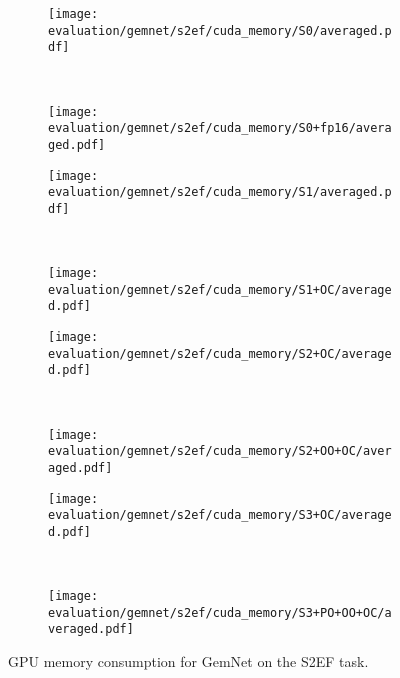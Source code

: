 \begin{figure}[H]

    \centering

    \begin{subfigure}[t]{0.45\textwidth}
        \centering
        \texttt{[image: evaluation/gemnet/s2ef/cuda\_memory/S0/averaged.pdf]}
    \end{subfigure}%
    ~
    \begin{subfigure}[t]{0.45\textwidth}
        \centering
        \texttt{[image: evaluation/gemnet/s2ef/cuda\_memory/S0+fp16/averaged.pdf]}
    \end{subfigure}

    \begin{subfigure}[t]{0.45\textwidth}
        \centering
        \texttt{[image: evaluation/gemnet/s2ef/cuda\_memory/S1/averaged.pdf]}
    \end{subfigure}%
    ~
    \begin{subfigure}[t]{0.45\textwidth}
        \centering
        \texttt{[image: evaluation/gemnet/s2ef/cuda\_memory/S1+OC/averaged.pdf]}
    \end{subfigure}

    \begin{subfigure}[t]{0.45\textwidth}
        \centering
        \texttt{[image: evaluation/gemnet/s2ef/cuda\_memory/S2+OC/averaged.pdf]}
    \end{subfigure}%
    ~
    \begin{subfigure}[t]{0.45\textwidth}
        \centering
        \texttt{[image: evaluation/gemnet/s2ef/cuda\_memory/S2+OO+OC/averaged.pdf]}
    \end{subfigure}

    \begin{subfigure}[t]{0.45\textwidth}
        \centering
        \texttt{[image: evaluation/gemnet/s2ef/cuda\_memory/S3+OC/averaged.pdf]}
    \end{subfigure}%
    ~
    \begin{subfigure}[t]{0.45\textwidth}
        \centering
        \texttt{[image: evaluation/gemnet/s2ef/cuda\_memory/S3+PO+OO+OC/averaged.pdf]}
    \end{subfigure}

    \caption{GPU memory consumption for GemNet on the S2EF task.}
    
\end{figure}

